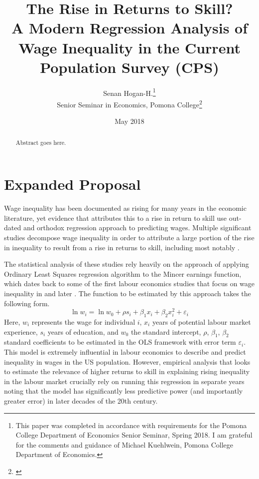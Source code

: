 \documentclass[notitlepage,12pt]{article}
\author{Senan Hogan-H.\footnote{This paper was completed in accordance with requirements for the Pomona College Department of Economics Senior Seminar, Spring 2018.  I am grateful for the comments and guidance of Michael Kuehlwein, Pomona College Department of Economics.} \\ Senior Seminar in Economics, Pomona College\footnote{\href{https://github.com/shoganhennessy/ECON190}{\color{blue}{\underline{This project's Github repository, which hosts all contributing materials, is available here.}}}}}
\title{The Rise in Returns to Skill? \\ \Large{A Modern Regression Analysis of Wage Inequality in the Current Population Survey (CPS)}}
\date{May 2018}
\begin{document}
\maketitle
\thispagestyle{empty}
\begin{abstract}
Abstract goes here.
\end{abstract}

\newpage
\setcounter{page}{1}

\section{Expanded Proposal}
Wage inequality has been documented as rising for many years in the economic literature, yet evidence that attributes this to a rise in return to skill use out-dated and orthodox regression approach to predicting wages.  Multiple significant studies decompose wage inequality in order to attribute a large portion of the rise in inequality to result from a rise in returns to skill, including most notably \cite{juhn1993wage}.  

The statistical analysis of these studies rely heavily on the approach of applying Ordinary Least Squares regression algorithm to the Mincer earnings function, which dates back to some of the first labour economics studies that focus on wage inequality in \cite{mincer1958investment} and later \cite{mincer1974schooling}.  The function to be estimated by this approach takes the following form.
\begin{equation}
\ln w_i = \ln w_0 + \rho s_i +\beta_1 x_i + \beta_2 x_i^2 + \varepsilon_i
\end{equation}
Here, $w_i$ represents the wage for individual $i$, $x_i$ years of potential labour market experience, $s_i$ years of education, and $w_0$ the standard intercept, $\rho$, $\beta_1$, $\beta_2$ standard coefficients to be estimated in the OLS framework with error term $\varepsilon_i$.  This model is extremely influential in labour economics to describe and predict inequality in wages in the US population.  However, empirical analysis that looks to estimate the relevance of higher returns to skill in explaining rising inequality in the labour market crucially rely on running this regression in separate years noting that the model has significantly less predictive power (and importantly greater error) in later decades of the 20th century.  
\end{document}
